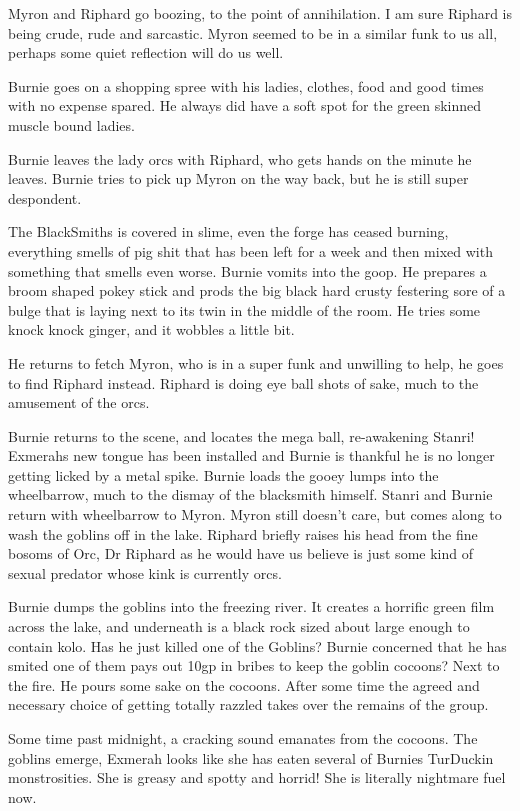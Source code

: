 Myron and Riphard go boozing, to the point of annihilation. I am sure Riphard is being crude, rude and sarcastic. Myron seemed to be in a similar funk to us all, perhaps some quiet reflection will do us well.\medskip

Burnie goes on a shopping spree with his ladies, clothes, food and good times with no expense spared. He always did have a soft spot for the green skinned muscle bound ladies.\medskip

Burnie leaves the lady orcs with Riphard, who gets hands on the minute he leaves. Burnie tries to pick up Myron on the way back, but he is still super despondent.\medskip

The BlackSmiths is covered in slime, even the forge has ceased burning, everything smells of pig shit that has been left for a week and then mixed with something that smells even worse. Burnie vomits into the goop. He prepares a broom shaped pokey stick and prods the big black hard crusty festering sore of a bulge that is laying next to its twin in the middle of the room. He tries some knock knock ginger, and it wobbles a little bit.\medskip

He returns to fetch Myron, who is in a super funk and unwilling to help, he goes to find Riphard instead. Riphard is doing eye ball shots of sake, much to the amusement of the orcs.\medskip

Burnie returns to the scene, and locates the mega ball, re-awakening Stanri! Exmerahs new tongue has been installed and Burnie is thankful he is no longer getting licked by a metal spike. Burnie loads the gooey lumps into the wheelbarrow, much to the dismay of the blacksmith himself. Stanri and Burnie return with wheelbarrow to Myron. Myron still doesn't care, but comes along to wash the goblins off in the lake. Riphard briefly raises his head from the fine bosoms of Orc, Dr Riphard as he would have us believe is just some kind of sexual predator whose kink is currently orcs.\medskip

Burnie dumps the goblins into the freezing river. It creates a horrific green film across the lake, and underneath is a black rock sized about large enough to contain kolo. Has he just killed one of the Goblins? Burnie concerned that he has smited one of them pays out 10gp in bribes to keep the goblin cocoons? Next to the fire. He pours some sake on the cocoons. After some time the agreed and necessary choice of getting totally razzled takes over the remains of the group.\medskip

Some time past midnight, a cracking sound emanates from the cocoons. The goblins emerge, Exmerah looks like she has eaten several of Burnies TurDuckin monstrosities. She is greasy and spotty and horrid! She is literally nightmare fuel now.\medskip

